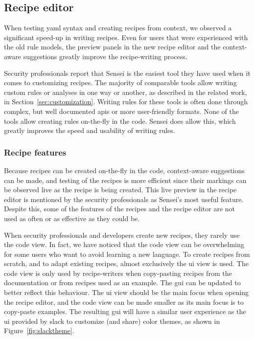 \subsection{Recipe editor}
When testing \gls{yaml} syntax and creating recipes from context, we observed a significant speed-up in writing recipes.
Even for users that were experienced with the old rule models, the preview panels in the new recipe editor and the context-aware suggestions greatly improve the recipe-writing process.

Security professionals report that Sensei is the easiest tool they have used when it comes to customizing recipes.
The majority of comparable tools allow writing custom rules or analyses in one way or another, as described in the related work, in Section~\ref{sec:customization}.
Writing rules for these tools is often done through complex, but well documented \glspl{api} or more user-friendly formats. 
None of the tools allow creating rules on-the-fly in the code.
Sensei does allow this, which greatly improves the speed and usability of writing rules.

\subsubsection{Recipe features}
Because recipes can be created on-the-fly in the code, context-aware suggestions can be made, and testing of the recipes is more efficient since their markings can be observed live as the recipe is being created.
This live preview in the recipe editor is mentioned by the security professionals as Sensei's most useful feature.
Despite this, some of the features of the recipes and the recipe editor are not used as often or as effective as they could be.

When security professionals and developers create new recipes, they rarely use the code view.
In fact, we have noticed that the code view can be overwhelming for some users who want to avoid learning a new language.
To create recipes from scratch, and to adapt existing recipes, almost exclusively the \gls{ui} view is used.
The code view is only used by recipe-writers when copy-pasting recipes from the documentation or from recipes used as an example.
The \gls{gui} can be updated to better reflect this behaviour.
The \gls{ui} view should be the main focus when opening the recipe editor, and the code view can be made smaller as its main focus is to copy-paste examples.
The resulting \gls{gui} will have a similar user experience as the \gls{ui} provided by \gls{slack} to customize (and share) color themes, as shown in Figure~\ref{fig:slacktheme}.

